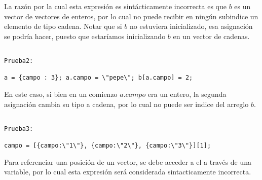 La razón por la cual esta expresión es sintácticamente incorrecta es que $b$ es un vector de vectores de enteros, por lo cual no puede recibir en ningún subindice un elemento de tipo cadena. Notar que si $b$ no estuviera inicializado, esa asignación se podría hacer, puesto que estaríamos inicializando $b$ en un vector de cadenas.

\begin{verbatim}

Prueba2:

a = {campo : 3}; a.campo = \"pepe\"; b[a.campo] = 2;

\end{verbatim}

En este caso, si bien en un comienzo $a.campo$ era un entero, la segunda asignación cambia su tipo a cadena, por lo cual no puede ser indice del arreglo $b$.

\begin{verbatim}

Prueba3:

campo = [{campo:\"1\"}, {campo:\"2\"}, {campo:\"3\"}][1];

\end{verbatim}

Para referenciar una posición de un vector, se debe acceder a el a través de una variable, por lo cual esta expresión será considerada sintacticamente incorrecta.

